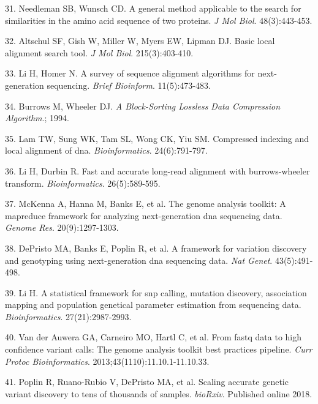 \documentclass[11pt,letterpaper]{book}
\begin{document}
\leavevmode\hypertarget{ref-needleman:1970aa}{}%
31. Needleman SB, Wunsch CD. A general method applicable to the search for similarities in the amino acid sequence of two proteins. \emph{J Mol Biol}. 48(3):443-453.

\leavevmode\hypertarget{ref-altschul:1990aa}{}%
32. Altschul SF, Gish W, Miller W, Myers EW, Lipman DJ. Basic local alignment search tool. \emph{J Mol Biol}. 215(3):403-410.

\leavevmode\hypertarget{ref-li:2010aa}{}%
33. Li H, Homer N. A survey of sequence alignment algorithms for next-generation sequencing. \emph{Brief Bioinform}. 11(5):473-483.

\leavevmode\hypertarget{ref-burrows:1994aa}{}%
34. Burrows M, Wheeler DJ. \emph{A Block-Sorting Lossless Data Compression Algorithm}.; 1994.

\leavevmode\hypertarget{ref-lam:2008aa}{}%
35. Lam TW, Sung WK, Tam SL, Wong CK, Yiu SM. Compressed indexing and local alignment of dna. \emph{Bioinformatics}. 24(6):791-797.

\leavevmode\hypertarget{ref-li:2010ab}{}%
36. Li H, Durbin R. Fast and accurate long-read alignment with burrows-wheeler transform. \emph{Bioinformatics}. 26(5):589-595.

\leavevmode\hypertarget{ref-mckenna:2010aa}{}%
37. McKenna A, Hanna M, Banks E, et al. The genome analysis toolkit: A mapreduce framework for analyzing next-generation dna sequencing data. \emph{Genome Res}. 20(9):1297-1303.

\leavevmode\hypertarget{ref-depristo:2011aa}{}%
38. DePristo MA, Banks E, Poplin R, et al. A framework for variation discovery and genotyping using next-generation dna sequencing data. \emph{Nat Genet}. 43(5):491-498.

\leavevmode\hypertarget{ref-li:2011aa}{}%
39. Li H. A statistical framework for snp calling, mutation discovery, association mapping and population genetical parameter estimation from sequencing data. \emph{Bioinformatics}. 27(21):2987-2993.

\leavevmode\hypertarget{ref-van-der-auwera:2013aa}{}%
40. Van der Auwera GA, Carneiro MO, Hartl C, et al. From fastq data to high confidence variant calls: The genome analysis toolkit best practices pipeline. \emph{Curr Protoc Bioinformatics}. 2013;43(1110):11.10.1-11.10.33.

\leavevmode\hypertarget{ref-poplin:2018aa}{}%
41. Poplin R, Ruano-Rubio V, DePristo MA, et al. Scaling accurate genetic variant discovery to tens of thousands of samples. \emph{bioRxiv}. Published online 2018.
\end{document}
